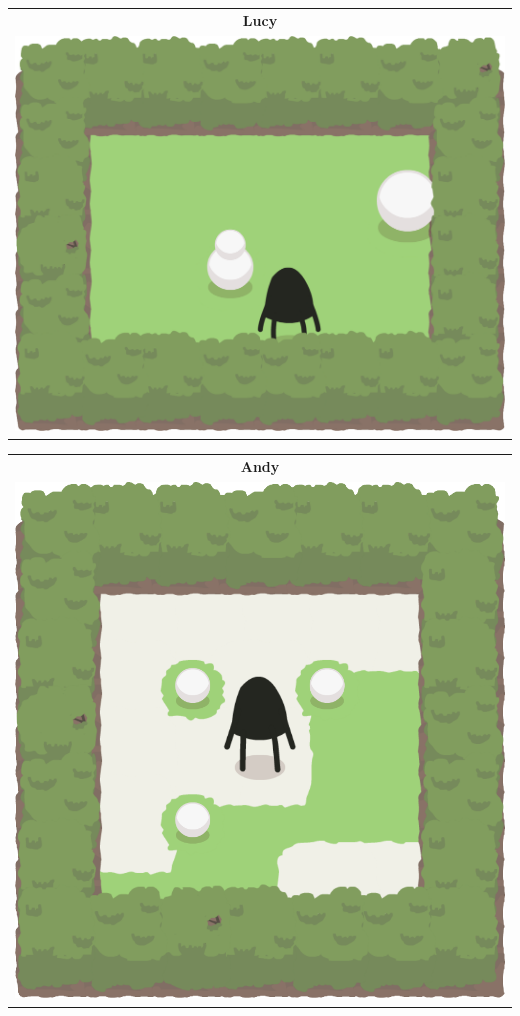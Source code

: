 \documentclass{report}
\theoremstyle{plain}
\begin{document}
\newcommand{\levelAnnexWidth}{0.11}

\begin{center}
\begin{tabular}{c}
\textbf{Lucy} \\
\includegraphics[scale=\levelAnnexWidth]{lucy-1.png}
\end{tabular}
\begin{tabular}{c}
\textbf{Andy} \\
\includegraphics[scale=\levelAnnexWidth]{andy-1.png}

\end{tabular}
\end{center}
\end{document}
